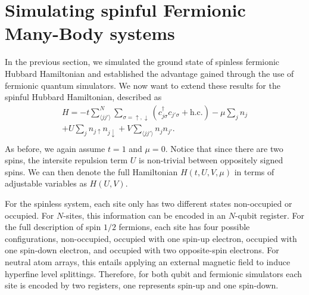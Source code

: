 \documentclass[aps, prx, reprint, superscriptaddress]{revtex4-2}
\begin{document}
\section{Simulating spinful Fermionic Many-Body systems}
\label{sec:IV}
In the previous section, we simulated the ground state of spinless fermionic Hubbard Hamiltonian and established the advantage gained through the use of fermionic quantum simulators. We now want to extend these results for the spinful Hubbard Hamiltonian, described as 
\begin{eqnarray}
    H = -t \sum_{\langle jj'\rangle}^{N}\sum_{\sigma = \uparrow, \downarrow} \left(c_{j \sigma}^{\dagger} c_{j'\sigma} + \text{h.c.} \right) -\mu \sum_{j} n_{j} \nonumber \\ + U \sum_{j} n_{j\uparrow} n_{j \downarrow} + V \sum_{\langle jj'\rangle} n_{j} n_{j'}\nonumber. \\
    \label{eq:hubbard}
\end{eqnarray}
As before, we again assume $t{=}1$ and $\mu{=}0$. Notice that since there are two spins, the intersite repulsion term $U$ is non-trivial between oppositely signed spins. We can then denote the full Hamiltonian $H(t,U,V,\mu)$ in terms of adjustable variables as $H(U,V)$. 

For the spinless system, each site only has two different states non-occupied or occupied. For $N$-sites, this information can be encoded in an $N$-qubit register. For the full description of spin $1/2$ fermions, each site has four possible configurations, non-occupied, occupied with one spin-up electron, occupied with one spin-down electron, and occupied with two opposite-spin electrons. For neutral atom arrays, this entails applying an external magnetic field to induce hyperfine level splittings. Therefore, for both qubit and fermionic simulators each site is encoded by two registers, one represents spin-up and one spin-down.
\end{document}
